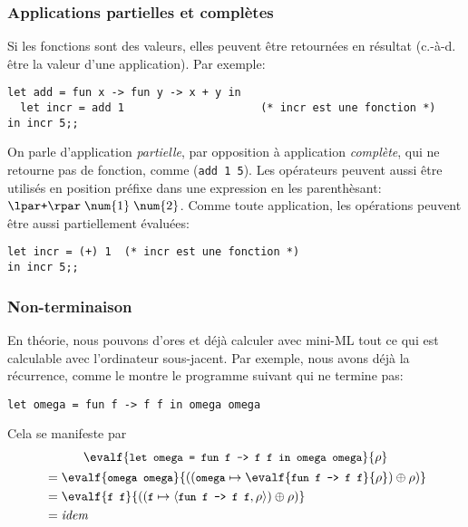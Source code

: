 % 
\begin{frame}[containsverbatim]
\frametitle{Applications partielles et complètes}
\label{application_partielle}

Si les fonctions sont des valeurs, elles peuvent être retournées en
résultat (c.-à-d. être la valeur d'une application). Par exemple:
{\small
\begin{verbatim}
let add = fun x -> fun y -> x + y in
  let incr = add 1                     (* incr est une fonction *)
in incr 5;;
\end{verbatim}
} On parle d'application \emph{partielle}, par opposition à
application \emph{complète}, qui ne retourne pas de fonction, comme
(\verb|add 1 5|). Les opérateurs peuvent aussi être utilisés en
position préfixe dans une expression en les parenthèsant:
$\lpar\texttt{+}\rpar \; \num{1} \; \num{2}$. Comme toute application,
les opérations peuvent être aussi partiellement évaluées: {\small
\begin{verbatim}
let incr = (+) 1  (* incr est une fonction *)
in incr 5;;
\end{verbatim}
}

\end{frame}

%
\begin{frame}[containsverbatim]
\frametitle{Non-terminaison}

En théorie, nous pouvons d'ores et déjà calculer avec mini-ML
tout ce qui est calculable avec l'ordinateur sous-jacent. Par exemple,
nous avons déjà la récurrence, comme le montre le programme suivant
qui ne termine pas:
\begin{center}
\verb|let omega = fun f -> f f in omega omega|
\end{center}
Cela se manifeste par
\begin{gather*}
\evalf{\texttt{\small let omega = fun f -> f f in omega omega}}{\rho}\\
\begin{align*}
&= \evalf{\texttt{\small omega omega}}{((\texttt{\small omega} \mapsto
\evalf{\texttt{\small fun f -> f f}}{\rho}) \oplus \rho)}\\
&= \evalf{\texttt{\small f f}}{((\texttt{\small f} \mapsto
    \langle\texttt{\small fun f -> f f},\rho\rangle) \oplus \rho)}\\
&= \textnormal{\emph{idem}}
\end{align*}
\end{gather*}

\end{frame}

